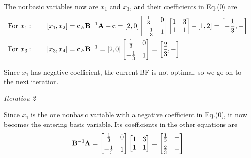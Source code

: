 \documentclass[a4paper]{article}
\begin{document}
\begin{enumerate}
\begin{solution}
	The nonbasic variables now are $x_1$ and $x_3$, and their coefficients in Eq.(0) are
	\begin{equation*}
	\begin{aligned}
	\text{For } x_1:\qquad
	[x_1,x_2]&=\mathbf{c}_B\mathbf{B}^{-1}\mathbf{A}-\mathbf{c}
	=[2,0]\begin{bmatrix}
	\tfrac{1}{3}&0\vspace*{0.2cm}\\
	-\tfrac{1}{3}&1\\
	\end{bmatrix}
	\begin{bmatrix}
	1&3\\
	1&1\\
	\end{bmatrix}-[1,2]
	=\left[-\dfrac{1}{3},-\right]
	\\
	\text{For } x_3:\qquad
	[x_3,x_4]&=\mathbf{c}_B\mathbf{B}^{-1}
	=[2,0]\begin{bmatrix}
	\tfrac{1}{3}&0\vspace*{0.2cm}\\
	-\tfrac{1}{3}&1\\
	\end{bmatrix}
	=\left[\dfrac{2}{3},- \right] 	
	\end{aligned}
	\end{equation*}
	
	Since $x_1$ has negative coefficient, the current BF is not optimal, so we go on to the next iteration.
	
	\textit{Iteration 2}
	
	Since $x_1$ is the one nonbasic variable with a negative coefficient in Eq.(0), it now becomes the entering basic variable. Its coefficients in the other equations are
	\begin{equation*}
	\mathbf{B}^{-1}\mathbf{A}=\begin{bmatrix}
	\tfrac{1}{3}&0\vspace*{0.2cm}\\
	-\tfrac{1}{3}&1\\
	\end{bmatrix}\begin{bmatrix}
	1&3\\
	1&1\\
	\end{bmatrix}
	=\begin{bmatrix}
	\tfrac{1}{3}&-\vspace*{0.2cm}\\
	\tfrac{2}{3}&-\\
	\end{bmatrix}
	\end{equation*}
	

\end{solution}
\end{enumerate}
\end{document}
